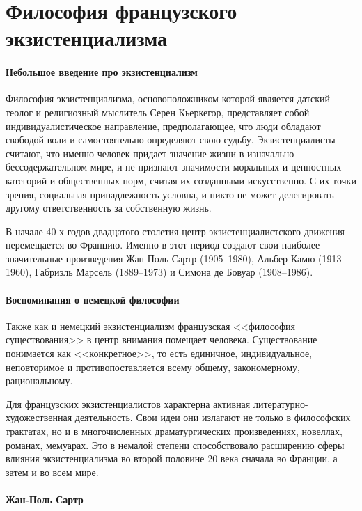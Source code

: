 \documentclass{bmstu}
\begin{document}
\chapter*{Философия французского экзистенциализма}

\subsubsection*{Небольшое введение про экзистенциализм}

Философия экзистенциализма, основоположником которой является датский теолог и религиозный мыслитель Серен Кьеркегор, представляет собой индивидуалистическое направление, предполагающее, что люди обладают свободой воли и самостоятельно определяют свою судьбу. Экзистенциалисты считают, что именно человек придает значение жизни в изначально бессодержательном мире, и не признают значимости моральных и ценностных категорий и общественных норм, считая их созданными искусственно. С их точки зрения, социальная принадлежность условна, и никто не может делегировать другому ответственность за собственную жизнь.

В начале 40-х годов двадцатого столетия центр экзистенциалистского движения перемещается во Францию. Именно в этот период создают свои наиболее значительные произведения Жан-Поль Сартр (1905--1980), Альбер Камю (1913--1960), Габриэль Марсель (1889--1973) и Симона де Бовуар (1908--1986).

\subsubsection*{Воспоминания о немецкой философии}

Также как и немецкий экзистенциализм французская <<философия существования>> в центр внимания помещает человека. Существование понимается как <<конкретное>>, то есть единичное, индивидуальное, неповторимое и противопоставляется всему общему, закономерному, рациональному.

Для французских экзистенциалистов характерна активная литературно-художественная деятельность. Свои идеи они излагают не только в философских трактатах, но и в многочисленных драматургических произведениях, новеллах, романах, мемуарах. Это в немалой степени способствовало расширению сферы влияния экзистенциализма во второй половине 20 века сначала во Франции, а затем и во всем мире.

\subsubsection*{Жан-Поль Сартр}
\end{document}
